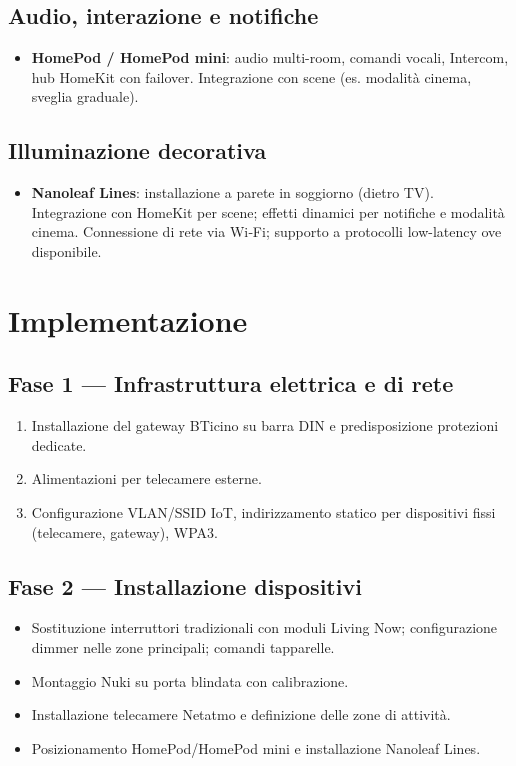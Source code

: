 \subsection*{Audio, interazione e notifiche}
\begin{itemize}
  \item \textbf{HomePod / HomePod mini}: audio multi-room, comandi vocali, Intercom, hub HomeKit con failover. Integrazione con scene (es. modalità cinema, sveglia graduale).
\end{itemize}

\subsection*{Illuminazione decorativa}
\begin{itemize}
  \item \textbf{Nanoleaf Lines}: installazione a parete in soggiorno (dietro TV). Integrazione con HomeKit per scene; effetti dinamici per notifiche e modalità cinema. Connessione di rete via Wi‑Fi; supporto a protocolli low-latency ove disponibile.
\end{itemize}

\section{Implementazione}
\subsection{Fase 1 — Infrastruttura elettrica e di rete}
\begin{enumerate}
  \item Installazione del gateway BTicino su barra DIN e predisposizione protezioni dedicate.
  \item Alimentazioni per telecamere esterne.
  \item Configurazione VLAN/SSID IoT, indirizzamento statico per dispositivi fissi (telecamere, gateway), WPA3.
\end{enumerate}

\subsection{Fase 2 — Installazione dispositivi}
\begin{itemize}
  \item Sostituzione interruttori tradizionali con moduli Living Now; configurazione dimmer nelle zone principali; comandi tapparelle.
  \item Montaggio Nuki su porta blindata con calibrazione.
  \item Installazione telecamere Netatmo e definizione delle zone di attività.
  \item Posizionamento HomePod/HomePod mini e installazione Nanoleaf Lines.
\end{itemize}


